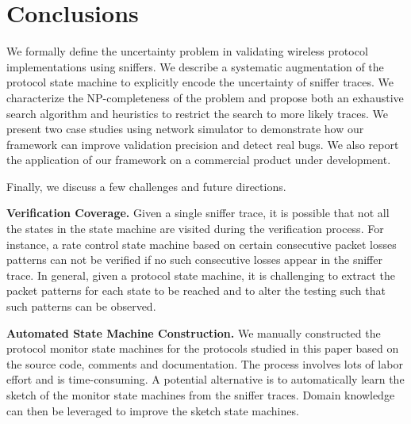 \section{Conclusions}
\label{sec:conclusion}

We formally define the uncertainty problem in validating wireless protocol
implementations using sniffers. We describe a systematic augmentation of the
protocol state machine to explicitly encode the uncertainty of sniffer traces.
We characterize the NP-completeness of the problem and propose both an
exhaustive search algorithm and heuristics to restrict the search to more likely
traces. We present two case studies using \ns{} network simulator to demonstrate
how our framework can improve validation precision and detect real bugs. We also
report the application of our framework on a commercial product under
development.

Finally, we discuss a few challenges and future
directions.

\textbf{Verification Coverage.} Given a single sniffer trace, it is possible
that not all the states in the state machine are visited during the verification
process. For instance, a rate control state machine based on certain consecutive
packet losses patterns can not be verified if no such consecutive losses appear
in the sniffer trace. In general, given a protocol state machine, it is
challenging to extract the packet patterns for each state to be reached and to
alter the testing such that such patterns can be observed.

\textbf{Automated State Machine Construction.} We manually constructed the
protocol monitor state machines for the protocols studied in this paper based on
the source code, comments and documentation. The process involves lots of labor
effort and is time-consuming. A potential alternative is to automatically learn
the sketch of the monitor state machines from the sniffer traces. Domain
knowledge can then be leveraged to improve the sketch state machines.
